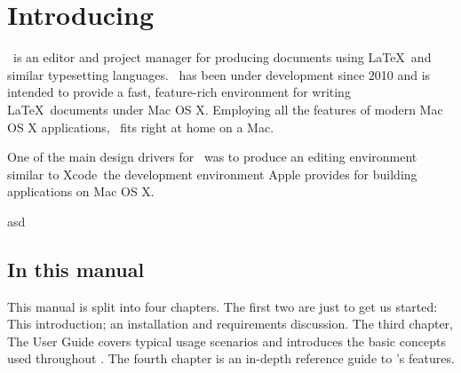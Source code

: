 
\chapter{Introducing \texnicle}
\label{ch:introduction}

\texnicle\ is an editor and project manager for producing documents using
\LaTeX\ and similar typesetting languages. \texnicle\ has been under development
since 2010 and is intended to provide a fast, feature-rich environment for
writing \LaTeX\ documents under Mac OS X. Employing all the features of modern
Mac OS X applications, \texnicle\ fits right at home on a Mac. 

One of the main design drivers for \texnicle\ was to produce an editing
environment similar to Xcode\,\cite{xcode} the development environment Apple provides for
building applications on Mac OS X.

asd


\section{In this manual}
\label{sec:in_this_manual}

This manual is split into four chapters. The first two are just to get us started: This introduction; an installation
and requirements discussion. The third chapter,  The User Guide covers typical
usage scenarios and introduces the basic concepts used throughout \texnicle. The
fourth chapter is an in-depth reference guide to \texnicle's features.




